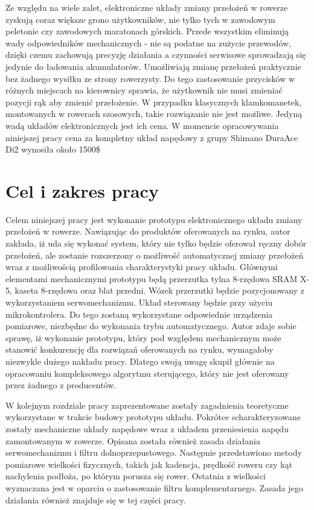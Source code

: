 Ze względu na wiele zalet, elektroniczne układy zmiany przełożeń w rowerze zyskują coraz większe grono użytkowników, nie tylko tych w zawodowym peletonie czy zawodowych maratonach górskich. Przede wszystkim eliminują wady odpowiedników mechanicznych - nie są podatne na zużycie przewodów, dzięki czemu zachowują precyzję działania a czynności serwisowe sprowadzają się jedynie do ładowania akumulatorów. Umożliwiają zmianę przełożeń praktycznie bez żadnego wysiłku ze strony rowerzysty. Do tego zastosowanie przycisków w różnych miejscach na kierownicy sprawia, że użytkownik nie musi zmieniać pozycji rąk aby zmienić przełożenie. W przypadku klasycznych klamkomanetek, montowanych w rowerach szosowych, takie rozwiązanie nie jest możliwe. Jedyną wadą układów elektronicznych jest ich cena. W momencie opracowywania niniejszej pracy cena za kompletny układ napędowy z grupy Shimano DuraAce Di2 wynosiła około 1500\$

\section{Cel i zakres pracy}
\label{sec:Cel Pracy}
Celem niniejszej pracy jest wykonanie prototypu elektronicznego układu zmiany przełożeń w rowerze. Nawiązując do produktów oferowanych na rynku, autor zakłada, iż uda się wykonać system, który nie tylko będzie oferował ręczny dobór przełożeń, ale zostanie rozszerzony o możliwość automatycznej zmiany przełożeń wraz z możliwością profilowania charakterystyki pracy układu. Głównymi elementami mechanicznymi prototypu będą przerzutka tylna 8-rzędowa SRAM X-5, kaseta 8-rzędowa oraz blat przedni. Wózek przerzutki będzie pozycjonowany z wykorzystaniem serwomechanizmu. Układ sterowany będzie przy użyciu mikrokontrolera. Do tego zostaną wykorzystane odpowiednie urządzenia pomiarowe, niezbędne do wykonania trybu automatycznego. Autor zdaje sobie sprawę, iż wykonanie prototypu, który pod względem mechanicznym może stanowić konkurencję dla rozwiązań oferowanych na rynku, wymagałoby niezwykle dużego nakładu pracy. Dlatego swoją uwagę skupił głównie na opracowaniu kompleksowego algorytmu sterującego, który nie jest oferowany przez żadnego z producentów.

W kolejnym rozdziale pracy zaprezentowane zostały zagadnienia teoretyczne wykorzystane w trakcie budowy prototypu układu. Pokrótce scharakteryzowane zostały  mechaniczne układy napędowe wraz z układem przeniesienia napędu zamontowanym w rowerze. Opisana została również zasada działania serwomechanizmu i filtru dolnoprzepustowego. Następnie przedstawiono metody pomiarowe wielkości fizycznych, takich jak kadencja, prędkość roweru czy kąt nachylenia podłoża, po którym porusza się rower. Ostatnia z wielkości wyznaczana jest w oparciu o zastosowanie filtru komplementarnego. Zasada jego działania również znajduje się w tej części pracy.

